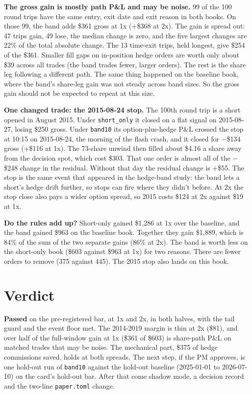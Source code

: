 \documentclass{article}
\begin{document}
\textbf{The gross gain is mostly path P\&L and may be noise.} 99 of the 100 round trips have the same entry, exit date and exit reason in both books. On those 99, the band adds \$361 gross at 1x (+\$368 at 2x). The gain is spread out: 47 trips gain, 49 lose, the median change is zero, and the five largest changes are 22\% of the total absolute change. The 13 time-exit trips, held longest, give \$254 of the \$361. Smaller fill gaps on in-position hedge orders are worth only about \$39 across all trades (the band trades fewer, larger orders). The rest is the share leg following a different path. The same thing happened on the baseline book, where the band's share-leg gain was not steady across band sizes. So the gross gain should not be expected to repeat at this size.

\textbf{One changed trade: the 2015-08-24 stop.} The 100th round trip is a short opened in August 2015. Under \texttt{short\_\allowbreak{}only} it closed on a flat signal on 2015-08-27, losing \$250 gross. Under \texttt{band10} its option-plus-hedge P\&L crossed the stop at 10:15 on 2015-08-24, the morning of the flash crash, and it closed for \ensuremath{-}\$134 gross (+\$116 at 1x). The 73-share unwind then filled about \$4.16 a share away from the decision spot, which cost \$303. That one order is almost all of the \ensuremath{-}\$248 change in the residual. Without that day the residual change is +\$55. The stop is the same event that appeared in the hedge-band study: the band lets a short's hedge drift further, so stops can fire where they didn't before. At 2x the stop close also pays a wider option spread, so 2015 costs \$124 at 2x against \$19 at 1x.

\textbf{Do the rules add up?} Short-only gained \$1,286 at 1x over the baseline, and the band gained \$963 on the baseline book. Together they gain \$1,889, which is 84\% of the sum of the two separate gains (86\% at 2x). The band is worth less on the short-only book (\$603 against \$963 at 1x) for two reasons. There are fewer orders to remove (375 against 445). The 2015 stop also lands on this book.

\section{Verdict}

\textbf{Passed} on the pre-registered bar, at 1x and 2x, in both halves, with the tail guard and the event floor met. The 2014-2019 margin is thin at 2x (\$81), and over half of the full-window gain at 1x (\$361 of \$603) is share-path P\&L on matched trades that may be noise. The mechanical part, \$375 of hedge commissions saved, holds at both spreads. The next step, if the PM approves, is one hold-out run of \texttt{band10} against the hold-out baseline (2025-01-01 to 2026-07-10) on the card's hold-out bar. After that come shadow mode, a decision record and the two-line \texttt{paper.\allowbreak{}toml} change.
\end{document}
